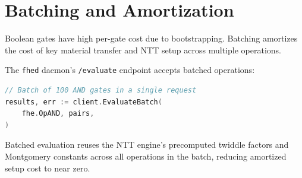 \section{Batching and Amortization}


Boolean gates have high per-gate cost due to bootstrapping. Batching amortizes the cost of key material transfer and NTT setup across multiple operations.

The \texttt{fhed} daemon's \texttt{/evaluate} endpoint accepts batched operations:

\begin{lstlisting}[language=Go]
// Batch of 100 AND gates in a single request
results, err := client.EvaluateBatch(
    fhe.OpAND, pairs,
)
\end{lstlisting}

Batched evaluation reuses the NTT engine's precomputed twiddle factors and Montgomery constants across all operations in the batch, reducing amortized setup cost to near zero.

